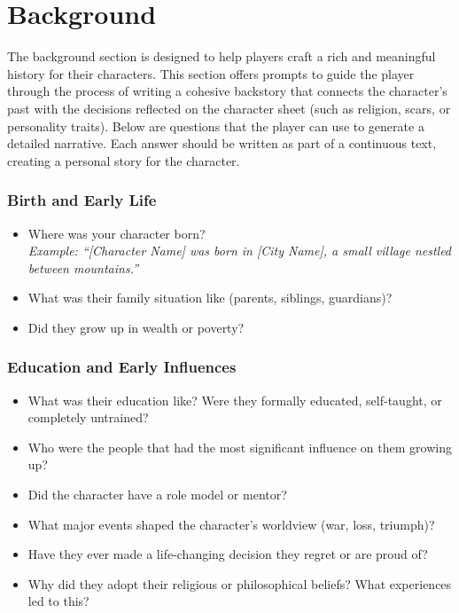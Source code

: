 \chapter{Background}

The background section is designed to help players craft a rich and meaningful history for their characters. This section offers prompts to guide the player through the process of writing a cohesive backstory that connects the character's past with the decisions reflected on the character sheet (such as religion, scars, or personality traits). Below are questions that the player can use to generate a detailed narrative. Each answer should be written as part of a continuous text, creating a personal story for the character.

\subsection*{Birth and Early Life}

\begin{itemize}
    \item Where was your character born? \\
    \textit{Example: ``[Character Name] was born in [City Name], a small village nestled between mountains.''}
    
    \item What was their family situation like (parents, siblings, guardians)?
    \item Did they grow up in wealth or poverty?
\end{itemize}

\subsection*{Education and Early Influences}

\begin{itemize}
    \item What was their education like? Were they formally educated, self-taught, or completely untrained?
    \item Who were the people that had the most significant influence on them growing up?
    \item Did the character have a role model or mentor?
    \item What major events shaped the character’s worldview (war, loss, triumph)?
    \item Have they ever made a life-changing decision they regret or are proud of?
    \item Why did they adopt their religious or philosophical beliefs? What experiences led to this?
\end{itemize}


